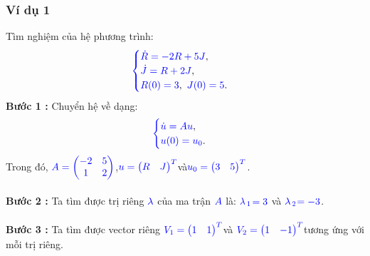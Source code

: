 \documentclass[a4paper]{article}
\begin{document}
\subsubsection{Ví dụ 1}
Tìm nghiệm của hệ phương trình:
\begin{align}
	    \textcolor{blue}{
	    \begin{cases}
            \dot R = -2R + 5J \textcolor{black}{,}\\
            \dot J = R + 2J \textcolor{black}{,}\\
            R(0) = 3\textcolor{black}{,} \enskip J(0) = 5 \textcolor{black}{.}
        \end{cases}
        }
        \notag
	\end{align}
{\bfseries Bước 1 :} Chuyển hệ về dạng:
\begin{align}
	    \textcolor{blue}{
	    \begin{cases}
            \dot u = Au \textcolor{black}{,}\\
            u(0) = u\sb{0}\textcolor{black}{.}
        \end{cases}
        }
        \notag
	\end{align}
Trong đó,  $\textcolor{blue}{A = \begin{pmatrix} -2 & 5\\ 1 & 2 \end{pmatrix}}$,\enskip $\textcolor{blue}{u = \begin{pmatrix} R & J \end{pmatrix}\sp{T}}$\enskip và\enskip $\textcolor{blue}{u\sb{0} = \begin{pmatrix} 3 & 5 \end{pmatrix}\sp{T}}$.\\\\
{\bfseries Bước 2 :} Ta tìm được trị riêng $\textcolor{blue}{\lambda}$ của ma trận $\textcolor{blue}{A}$ là: $\textcolor{blue}{\lambda}$$\textcolor{blue}{\sb{1}}$$\textcolor{blue}{=3}$ và $\textcolor{blue}{\lambda}$$\textcolor{blue}{\sb{2}}$$\textcolor{blue}{=-3}$.\\\\
{\bfseries Bước 3 :} Ta tìm được vector riêng \enskip $\textcolor{blue}{V\sb{1} = \begin{pmatrix} 1 & 1 \end{pmatrix}\sp{T}}$\enskip và \enskip $\textcolor{blue}{V\sb{2} = \begin{pmatrix} 1 & -1 \end{pmatrix}\sp{T}}$\enskip tương ứng với mỗi trị riêng.\\\\
\end{document}
